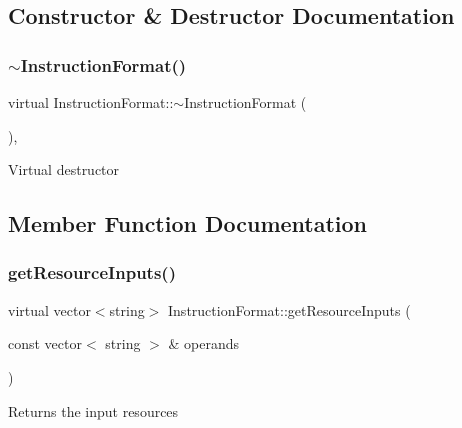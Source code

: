 \subsection{Constructor \& Destructor Documentation}
\mbox{\label{classInstructionFormat_a104e78d49e31e4e88ac9545dbadf9f7a}} 
\subsubsection{\texorpdfstring{$\sim$\+Instruction\+Format()}{~InstructionFormat()}}
{\footnotesize\ttfamily virtual Instruction\+Format\+::$\sim$\+Instruction\+Format (\begin{DoxyParamCaption}{ }\end{DoxyParamCaption})\hspace{0.3cm}{\ttfamily [inline]}, {\ttfamily [virtual]}}

Virtual destructor 

\subsection{Member Function Documentation}
\mbox{\label{classInstructionFormat_a09775d3a3c22f40a0f44504664e586e4}} 
\subsubsection{\texorpdfstring{get\+Resource\+Inputs()}{getResourceInputs()}}
{\footnotesize\ttfamily virtual vector$<$string$>$ Instruction\+Format\+::get\+Resource\+Inputs (\begin{DoxyParamCaption}\item[{const vector$<$ string $>$ \&}]{operands }\end{DoxyParamCaption})\hspace{0.3cm}{\ttfamily [pure virtual]}}

Returns the input resources 

